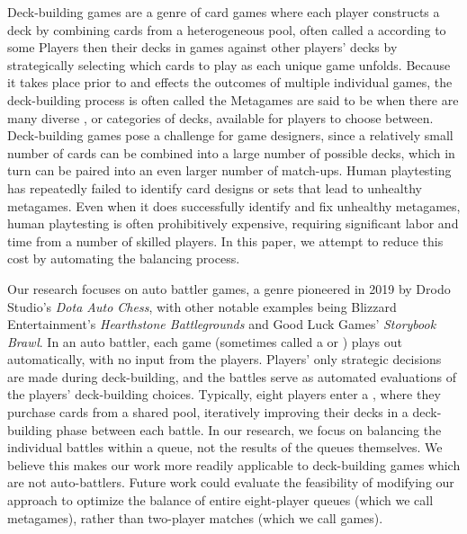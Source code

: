 
Deck-building games are a genre of card games where each player
constructs a deck by combining cards from a heterogeneous pool, often
called a  according to some  Players then  their decks in games against
other players' decks by strategically selecting which cards to play as
each unique game unfolds. Because it takes place prior to and effects
the outcomes of multiple individual games, the deck-building process
is often called the   Metagames are said to be
 when there are many diverse , or
categories of decks, available for players to choose between.
Deck-building games pose a challenge for game designers, since a
relatively small number of cards can be combined into a large number
of possible decks, which in turn can be paired into an even larger
number of match-ups. Human playtesting has repeatedly failed to
identify card designs or sets that lead to unhealthy metagames.
Even when it does successfully identify and fix unhealthy metagames,
human playtesting is often prohibitively expensive, requiring
significant labor and time from a number of skilled players. In this
paper, we attempt to reduce this cost by automating the balancing
process.

Our research focuses on auto battler games, a genre pioneered in 2019
by Drodo Studio's \textit{Dota Auto Chess}, with other notable
examples being Blizzard Entertainment's \textit{Hearthstone
  Battlegrounds} and Good Luck Games' \textit{Storybook Brawl}.
In an auto battler, each game (sometimes called a  or
) plays out automatically, with no input from the
players. Players' only strategic decisions are made during
deck-building, and the battles serve as automated evaluations of the
players' deck-building choices. Typically, eight players enter a
, where they purchase cards from a shared pool,
iteratively improving their decks in a deck-building phase between
each battle. In our research, we focus on balancing the individual
battles within a queue, not the results of the queues themselves. We
believe this makes our work more readily applicable to deck-building
games which are not auto-battlers. Future work could evaluate the
feasibility of modifying our approach to optimize the balance of
entire eight-player queues (which we call metagames), rather than
two-player matches (which we call games).

